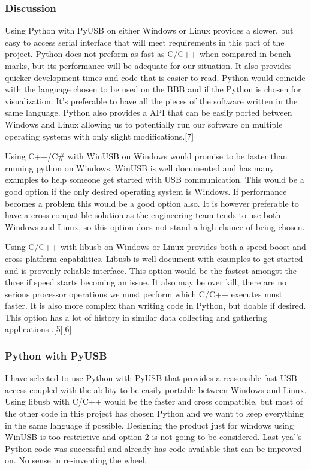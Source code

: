 \documentclass[10pt,draftclsnofoot,onecolumn]{IEEEtran}
\begin{document}
\subsubsection{Discussion}
Using Python with PyUSB on either Windows or Linux provides a slower, but easy to access serial interface that will meet requirements in this part of the project. Python does not preform as fast as C/C++ when compared in bench marks, but its performance will be adequate for our situation. It also provides quicker development times and code that is easier to read. Python would coincide with the language chosen to be used on the BBB and if the Python is chosen for visualization. It’s preferable to have all the pieces of the software written in the same language. Python also provides a API that can be easily ported between Windows and Linux allowing us to potentially run our software on multiple operating systems with only slight modifications.[7] \par
Using C++/C\# with WinUSB on Windows would promise to be faster than running python on Windows. WinUSB is well documented and has many examples to help someone get started with USB communication. This would be a good option if the only desired operating system is Windows.  If performance becomes a problem this would be a good option also. It is however preferable to have a cross compatible solution as the engineering team tends to use both Windows and Linux, so this option does not stand a high chance of being chosen. \par
Using C/C++ with libusb on Windows or Linux provides both a speed boost and cross platform capabilities.  Libusb is well document with examples to get started and is provenly reliable interface. This option would be the fastest amongst the three if speed starts becoming an issue. It also may be over kill, there are no serious processor operations we must perform which C/C++ executes must faster. It is also more complex than writing code in Python, but doable if desired. This option has a lot of history in similar data collecting and gathering applications .[5][6] \\

\subsubsection{Python with PyUSB}
        I have selected to use Python with PyUSB that provides a reasonable fast USB access coupled with the ability to be easily portable between Windows and Linux. Using libusb with C/C++ would be the faster and cross compatible, but most of the other code in this project has chosen Python and we want to keep everything in the same language if possible. Designing the product just for windows using WinUSB is too restrictive and option 2 is not going to be considered. Last yea'’s Python code was successful and already has code available that can be improved on. No sense in re-inventing the wheel.
\end{document}
